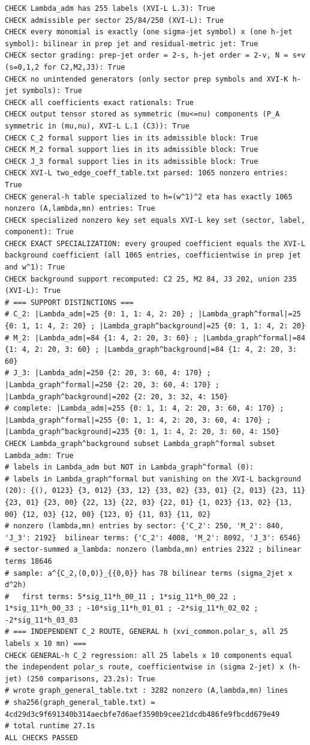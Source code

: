 \documentclass{article}
\theoremstyle{remark}
\begin{document}
\begin{lstlisting}
CHECK Lambda_adm has 255 labels (XVI-L L.3): True
CHECK admissible per sector 25/84/250 (XVI-L): True
CHECK every monomial is exactly (one sigma-jet symbol) x (one h-jet symbol): bilinear in prep jet and residual-metric jet: True
CHECK sector grading: prep-jet order = 2-s, h-jet order = 2-v, N = s+v (s=0,1,2 for C2,M2,J3): True
CHECK no unintended generators (only sector prep symbols and XVI-K h-jet symbols): True
CHECK all coefficients exact rationals: True
CHECK output tensor stored as symmetric (mu<=nu) components (P_A symmetric in (mu,nu), XVI-L L.1 (C3)): True
CHECK C_2 formal support lies in its admissible block: True
CHECK M_2 formal support lies in its admissible block: True
CHECK J_3 formal support lies in its admissible block: True
CHECK XVI-L two_edge_coeff_table.txt parsed: 1065 nonzero entries: True
CHECK general-h table specialized to h=(w^1)^2 eta has exactly 1065 nonzero (A,lambda,mn) entries: True
CHECK specialized nonzero key set equals XVI-L key set (sector, label, component): True
CHECK EXACT SPECIALIZATION: every grouped coefficient equals the XVI-L background coefficient (all 1065 entries, coefficientwise in prep jet and w^1): True
CHECK background support recomputed: C2 25, M2 84, J3 202, union 235 (XVI-L): True
# === SUPPORT DISTINCTIONS ===
# C_2: |Lambda_adm|=25 {0: 1, 1: 4, 2: 20} ; |Lambda_graph^formal|=25 {0: 1, 1: 4, 2: 20} ; |Lambda_graph^background|=25 {0: 1, 1: 4, 2: 20}
# M_2: |Lambda_adm|=84 {1: 4, 2: 20, 3: 60} ; |Lambda_graph^formal|=84 {1: 4, 2: 20, 3: 60} ; |Lambda_graph^background|=84 {1: 4, 2: 20, 3: 60}
# J_3: |Lambda_adm|=250 {2: 20, 3: 60, 4: 170} ; |Lambda_graph^formal|=250 {2: 20, 3: 60, 4: 170} ; |Lambda_graph^background|=202 {2: 20, 3: 32, 4: 150}
# complete: |Lambda_adm|=255 {0: 1, 1: 4, 2: 20, 3: 60, 4: 170} ; |Lambda_graph^formal|=255 {0: 1, 1: 4, 2: 20, 3: 60, 4: 170} ; |Lambda_graph^background|=235 {0: 1, 1: 4, 2: 20, 3: 60, 4: 150}
CHECK Lambda_graph^background subset Lambda_graph^formal subset Lambda_adm: True
# labels in Lambda_adm but NOT in Lambda_graph^formal (0): 
# labels in Lambda_graph^formal but vanishing on the XVI-L background (20): {(), 0123} {3, 012} {33, 12} {33, 02} {33, 01} {2, 013} {23, 11} {23, 01} {23, 00} {22, 13} {22, 03} {22, 01} {1, 023} {13, 02} {13, 00} {12, 03} {12, 00} {123, 0} {11, 03} {11, 02}
# nonzero (lambda,mn) entries by sector: {'C_2': 250, 'M_2': 840, 'J_3': 2192}  bilinear terms: {'C_2': 4008, 'M_2': 8092, 'J_3': 6546}
# sector-summed a_lambda: nonzero (lambda,mn) entries 2322 ; bilinear terms 18646
# sample: a^{C_2,(0,0)}_{{0,0}} has 78 bilinear terms (sigma_2jet x d^2h)
#   first terms: 5*sig_11*h_00_11 ; 1*sig_11*h_00_22 ; 1*sig_11*h_00_33 ; -10*sig_11*h_01_01 ; -2*sig_11*h_02_02 ; -2*sig_11*h_03_03
# === INDEPENDENT C_2 ROUTE, GENERAL h (xvi_common.polar_s, all 25 labels x 10 mn) ===
CHECK GENERAL-h C_2 regression: all 25 labels x 10 components equal the independent polar_s route, coefficientwise in (sigma 2-jet) x (h-jet) (250 comparisons, 23.2s): True
# wrote graph_general_table.txt : 3282 nonzero (A,lambda,mn) lines
# sha256(graph_general_table.txt) = 4cd29d3c9f691340b314aecbfe7d6aef3590b9cee21dcdb486fe9fbcdd679e49
# total runtime 27.1s
ALL CHECKS PASSED
\end{lstlisting}
\end{document}
